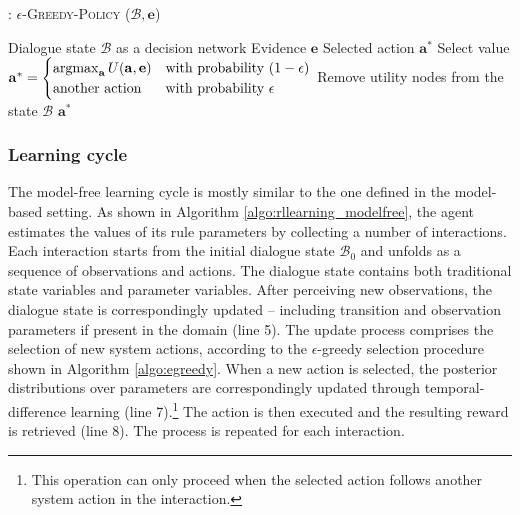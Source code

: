 \begin{algorithm}[h!]
\caption{: \textsc{$\epsilon$-Greedy-Policy} ($\mathcal{B}, \mathbf{e}$)}
\begin{algorithmic}[1] \vspace{1mm}
\REQUIRE Dialogue state $\mathcal{B}$ as a decision network
\REQUIRE Evidence $\mathbf{e}$
\ENSURE Selected action $\mathbf{a}^*$
\STATE Select value $\mathbf{a}^* = \begin{cases} \argmax_{\mathbf{a}} U(\mathbf{a}, \mathbf{e}) & \text{with probability } (1- \epsilon) \\ \text{another action} & \text{with probability } \epsilon \end{cases}$
\STATE Remove utility nodes from the state $\mathcal{B}$
\RETURN $\mathbf{a}^*$
\end{algorithmic}
\label{algo:egreedy}
\end{algorithm}

\subsubsection*{Learning cycle}

The model-free learning cycle is mostly similar to the one defined in the model-based setting.  As shown in Algorithm \ref{algo:rllearning_modelfree}, the agent estimates the values of its rule parameters by collecting a number of interactions.  Each interaction starts from the initial dialogue state $\mathcal{B}_0$ and unfolds as a sequence of observations and actions.  The dialogue state contains both traditional state variables and parameter variables.  After perceiving new observations, the dialogue state is correspondingly updated -- including transition and observation parameters if present in the domain (line 5).  The update process comprises the selection of new system actions, according to the $\epsilon$-greedy selection procedure shown in Algorithm \ref{algo:egreedy}. When a new action is selected, the posterior distributions over parameters are correspondingly updated through temporal-difference learning (line 7).\footnote{This operation can only proceed when the selected action follows another system action in the interaction.} The action is then executed and the resulting reward is retrieved (line 8).  The process is repeated for each interaction. 


